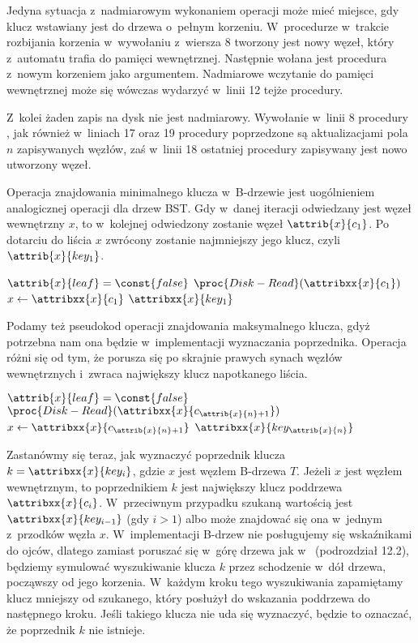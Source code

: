 
\exercise %
\exercise %
Jedyna sytuacja z~nadmiarowym wykonaniem operacji  może mieć miejsce, gdy klucz wstawiany jest do drzewa o~pełnym korzeniu.
W~procedurze  w~trakcie rozbijania korzenia w~wywołaniu z~wiersza 8 tworzony jest nowy węzeł, który z~automatu trafia do pamięci wewnętrznej.
Następnie wołana jest procedura  z~nowym korzeniem jako argumentem.
Nadmiarowe wczytanie do pamięci wewnętrznej może się wówczas wydarzyć w~linii 12 tejże procedury.

Z~kolei żaden zapis na dysk nie jest nadmiarowy.
Wywołanie  w~linii 8 procedury , jak również w~liniach 17 oraz 19 procedury  poprzedzone są aktualizacjami pola $n$ zapisywanych węzłów, zaś w~linii 18 ostatniej procedury zapisywany jest nowo utworzony węzeł.

\exercise %
Operacja znajdowania minimalnego klucza w~B-drzewie jest uogólnieniem analogicznej operacji dla drzew BST.
Gdy w~danej iteracji odwiedzany jest węzeł wewnętrzny $x$, to w~kolejnej odwiedzony zostanie węzeł $\attrib{x}{c_1}$.
Po dotarciu do liścia $x$ zwrócony zostanie najmniejszy jego klucz, czyli $\attrib{x}{key_1}$.
\begin{codebox}
\li	\While $\attrib{x}{leaf}=\const{false}$
\li		\Do $\proc{Disk-Read}(\attribxx{x}{c_1})$
\li     $x\gets\attribxx{x}{c_1}$
		\End
\li	\Return $\attribxx{x}{key_1}$
\end{codebox}

Podamy też pseudokod operacji znajdowania maksymalnego klucza, gdyż potrzebna nam ona będzie w~implementacji wyznaczania poprzednika.
Operacja różni się od  tym, że porusza się po skrajnie prawych synach węzłów wewnętrznych i~zwraca największy klucz napotkanego liścia.
\begin{codebox}
\li	\While $\attrib{x}{leaf}=\const{false}$
\li		\Do $\proc{Disk-Read}(\attribxx{x}{c_{\attrib{x}{n}+1}})$
\li     $x\gets\attribxx{x}{c_{\attrib{x}{n}+1}}$
		\End
\li	\Return $\attribxx{x}{key_{\attrib{x}{n}}}$
\end{codebox}

Zastanówmy się teraz, jak wyznaczyć poprzednik klucza $k=\attribxx{x}{key_i}$, gdzie $x$ jest węzłem B-drzewa $T$.
Jeżeli $x$ jest węzłem wewnętrznym, to poprzednikiem $k$ jest największy klucz poddrzewa $\attribxx{x}{c_i}$.
W~przeciwnym przypadku szukaną wartością jest $\attribxx{x}{key_{i-1}}$ (gdy $i>1$) albo może znajdować się ona w~jednym z~przodków węzła $x$.
W~implementacji B-drzew nie posługujemy się wskaźnikami do ojców, dlatego zamiast poruszać się w~górę drzewa jak w~ (podrozdział 12.2), będziemy symulować wyszukiwanie klucza $k$ przez schodzenie w~dół drzewa, począwszy od jego korzenia.
W~każdym kroku tego wyszukiwania zapamiętamy klucz mniejszy od szukanego, który posłużył do wskazania poddrzewa do następnego kroku.
Jeśli takiego klucza nie uda się wyznaczyć, będzie to oznaczać, że poprzednik $k$ nie istnieje.

